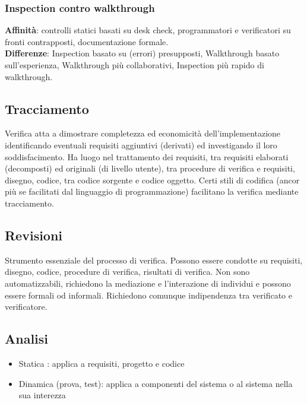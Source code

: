 \subsubsection{Inspection contro walkthrough}
\textbf{Affinità}: controlli statici basati su desk check, programmatori e verificatori su fronti contrapposti,
documentazione formale.\\
\textbf{Differenze}: Inspection basato su (errori) presupposti, Walkthrough basato sull'esperienza, Walkthrough più collaborativi, Inspection più rapido di walkthrough.

\subsection{Tracciamento}
Verifica atta a dimostrare completezza ed economicità dell'implementazione identificando eventuali requisiti aggiuntivi (derivati) ed investigando il loro soddisfacimento. Ha luogo nel trattamento dei requisiti, tra requisiti elaborati (decomposti) ed originali (di livello utente), tra procedure di verifica e requisiti, disegno, codice, tra codice sorgente e codice oggetto. Certi stili di codifica (ancor più se facilitati dal linguaggio di programmazione) facilitano la verifica mediante tracciamento.

\subsection{Revisioni}
Strumento essenziale del processo di verifica. Possono essere condotte su requisiti, disegno, codice, procedure di verifica, risultati di verifica. Non sono automatizzabili, richiedono la mediazione e l'interazione di individui e possono essere formali od informali. Richiedono comunque indipendenza tra verificato e verificatore.

\subsection{Analisi}
\begin{itemize}
\item Statica : applica a requisiti, progetto e codice
\item Dinamica (prova, test): applica a componenti del sistema o al sistema nella sua interezza
\end{itemize}

